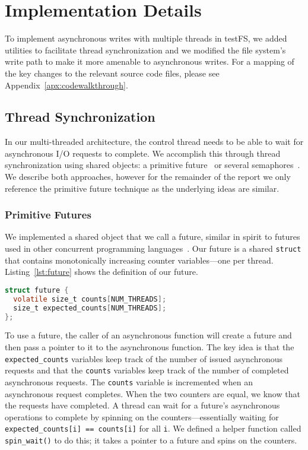 \section{Implementation Details}
To implement asynchronous writes with multiple threads in testFS, we added
utilities to facilitate thread synchronization and we modified the file
system's write path to make it more amenable to asynchronous writes. For a
mapping of the key changes to the relevant source code files, please see
Appendix~\ref{apx:codewalkthrough}.

\subsection{Thread Synchronization}\label{sec:threadsync}
In our multi-threaded architecture, the control thread needs to be able to wait
for asynchronous I/O requests to complete. We accomplish this through thread
synchronization using shared objects: a primitive
future~\cite{futures-halstead85} or several
semaphores~\cite{semaphores-dijkstra65}. We describe both approaches, however
for the remainder of the report we only reference the primitive future
technique as the underlying ideas are similar.

\subsubsection{Primitive Futures}
We implemented a shared object that we call a future, similar in spirit to
futures used in other concurrent programming
languages~\cite{futures-halstead85}. Our future is a shared {\tt struct} that
contains monotonically increasing counter variables---one per thread.
Listing~\ref{lst:future} shows the definition of our future.

\begin{lstlisting}[language=C,
  caption={Our primitive future},
  captionpos=b,
  label={lst:future}]
struct future {
  volatile size_t counts[NUM_THREADS];
  size_t expected_counts[NUM_THREADS];
};
\end{lstlisting}

To use a future, the caller of an asynchronous function will create a future
and then pass a pointer to it to the asynchronous function. The key idea is
that the {\tt expected\_counts} variables keep track of the number of issued
asynchronous requests and that the {\tt counts} variables keep track of the
number of completed asynchronous requests. The {\tt counts} variable is
incremented when an asynchronous request completes. When the two counters are
equal, we know that the requests have completed. A thread can wait for a
future's asynchronous operations to complete by spinning on the
counters---essentially waiting for {\tt expected\_counts[i] == counts[i]} for
all {\tt i}. We defined a helper function called {\tt spin\_wait()} to do this;
it takes a pointer to a future and spins on the counters.

